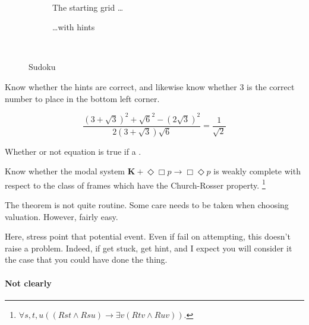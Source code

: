 \begin{note}
  \begin{illustration}[Sudoku]
    \label{illu:gist:sudoku}
    \begin{figure}[H]
      \mbox{ }\hfill
      \begin{subfigure}{0.45\linewidth}
        \centering
        \sudokuGrid{}
        \caption{The starting grid \dots}
        \label{fig:sudoku:grid}
      \end{subfigure}
      \hfill
      \begin{subfigure}{0.45\linewidth}
        \centering
        \sudokuGridHints{}
        \caption{\dots with hints}
        \label{fig:sudoku:hint}
      \end{subfigure}
      \hfill\mbox{ }
      \caption{Sudoku}
      \label{fig:sudoku}
    \end{figure}
    Know whether the hints are correct, and likewise know whether 3 is the correct number to place in the bottom left corner.
  \end{illustration}
\end{note}

\begin{note}
  \[\frac{(3 + \sqrt{3})^{2} + \sqrt{6}^{2} - (2\sqrt{3})^{2}}{2(3 + \sqrt{3})\sqrt{6}} = \frac{1}{\sqrt{2}}\]

  Whether or not equation is true if a \fc{}.
\end{note}

\begin{note}
  Know whether the modal system \(\mathbf{K} + \Diamond\Box p \rightarrow \Box\Diamond p\) is weakly complete with respect to the class of frames which have the Church-Rosser property.%
  \footnote{
    \(\forall s,t,u((Rst \land Rsu) \rightarrow \exists v(Rtv \land Ruv))\).
  }

  The theorem is not quite routine.
  Some care needs to be taken when choosing valuation.
  However, fairly easy.

  Here, stress point that potential event.
  Even if fail on attempting, this doesn't raise a problem.
  Indeed, if get stuck, get hint, and I expect you will consider it the case that you could have done the thing.
\end{note}

\paragraph{Not clearly }

